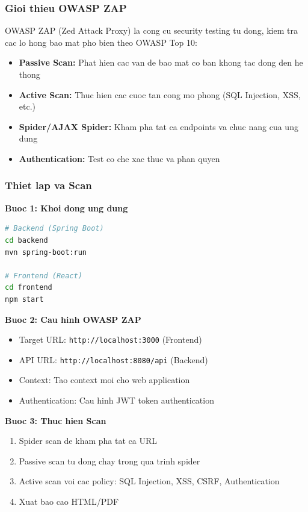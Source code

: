 \subsubsection{Gioi thieu OWASP ZAP}

OWASP ZAP (Zed Attack Proxy) la cong cu security testing tu dong, kiem tra cac lo hong bao mat pho bien theo OWASP Top 10:

\begin{itemize}
    \item \textbf{Passive Scan:} Phat hien cac van de bao mat co ban khong tac dong den he thong
    \item \textbf{Active Scan:} Thuc hien cac cuoc tan cong mo phong (SQL Injection, XSS, etc.)
    \item \textbf{Spider/AJAX Spider:} Kham pha tat ca endpoints va chuc nang cua ung dung
    \item \textbf{Authentication:} Test co che xac thuc va phan quyen
\end{itemize}

\subsubsection{Thiet lap va Scan}

\textbf{Buoc 1: Khoi dong ung dung}
\begin{lstlisting}[language=bash]
# Backend (Spring Boot)
cd backend
mvn spring-boot:run

# Frontend (React)  
cd frontend
npm start
\end{lstlisting}

\textbf{Buoc 2: Cau hinh OWASP ZAP}
\begin{itemize}
    \item Target URL: \texttt{http://localhost:3000} (Frontend)
    \item API URL: \texttt{http://localhost:8080/api} (Backend)
    \item Context: Tao context moi cho web application
    \item Authentication: Cau hinh JWT token authentication
\end{itemize}

\textbf{Buoc 3: Thuc hien Scan}
\begin{enumerate}
    \item Spider scan de kham pha tat ca URL
    \item Passive scan tu dong chay trong qua trinh spider
    \item Active scan voi cac policy: SQL Injection, XSS, CSRF, Authentication
    \item Xuat bao cao HTML/PDF
\end{enumerate}

